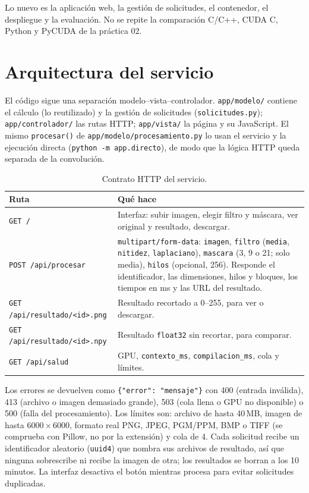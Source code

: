 \documentclass[12pt]{article}
\begin{document}
Lo nuevo es la aplicación web, la gestión de solicitudes, el contenedor, el despliegue y la
evaluación. No se repite la comparación C/C++, CUDA C, Python y PyCUDA de la práctica 02.

\section{Arquitectura del servicio}

El código sigue una separación modelo--vista--controlador. \texttt{app/modelo/} contiene el cálculo
(lo reutilizado) y la gestión de solicitudes (\texttt{solicitudes.py}); \texttt{app/controlador/} las
rutas HTTP; \texttt{app/vista/} la página y su JavaScript. El mismo \texttt{procesar()} de
\texttt{app/modelo/procesamiento.py} lo usan el servicio y la ejecución directa
(\texttt{python -m app.directo}), de modo que la lógica HTTP queda separada de la convolución.

\begin{table}[H]
\centering
\small
\caption{Contrato HTTP del servicio.}\label{tab:contrato}
\begin{tabular}{p{4.2cm}p{10.3cm}}
\toprule
Ruta & Qué hace \\
\midrule
\texttt{GET /} & Interfaz: subir imagen, elegir filtro y máscara, ver original y resultado, descargar. \\
\texttt{POST /api/procesar} & \texttt{multipart/form-data}: \texttt{imagen}, \texttt{filtro}
(\texttt{media}, \texttt{nitidez}, \texttt{laplaciano}), \texttt{mascara} (3, 9 o 21; solo media),
\texttt{hilos} (opcional, 256). Responde el identificador, las dimensiones, hilos y bloques, los
tiempos en ms y las URL del resultado. \\
\texttt{GET /api/resultado/<id>.png} & Resultado recortado a 0--255, para ver o descargar. \\
\texttt{GET /api/resultado/<id>.npy} & Resultado \texttt{float32} sin recortar, para comparar. \\
\texttt{GET /api/salud} & GPU, \texttt{contexto\_ms}, \texttt{compilacion\_ms}, cola y límites. \\
\bottomrule
\end{tabular}
\end{table}

Los errores se devuelven como \texttt{\{"error": "mensaje"\}} con 400 (entrada inválida), 413
(archivo o imagen demasiado grande), 503 (cola llena o GPU no disponible) o 500 (falla del
procesamiento). Los límites son: archivo de hasta 40\,MB, imagen de hasta $6000\times6000$, formato
real PNG, JPEG, PGM/PPM, BMP o TIFF (se comprueba con Pillow, no por la extensión) y cola de 4. Cada
solicitud recibe un identificador aleatorio (\texttt{uuid4}) que nombra sus archivos de resultado,
así que ninguna sobrescribe ni recibe la imagen de otra; los resultados se borran a los 10 minutos.
La interfaz desactiva el botón mientras procesa para evitar solicitudes duplicadas.
\end{document}
